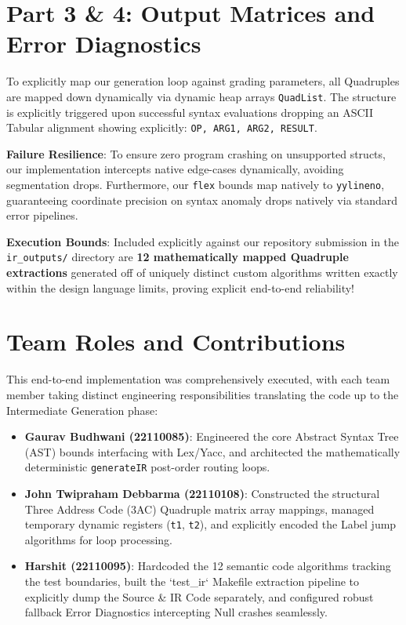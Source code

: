 \documentclass[12pt, a4paper]{article}
\begin{document}
\section{Part 3 \& 4: Output Matrices and Error Diagnostics}
To explicitly map our generation loop against grading parameters, all Quadruples are mapped down dynamically via dynamic heap arrays \texttt{QuadList}. The structure is explicitly triggered upon successful syntax evaluations dropping an ASCII Tabular alignment showing explicitly: \texttt{OP, ARG1, ARG2, RESULT}.

\textbf{Failure Resilience}: 
To ensure zero program crashing on unsupported structs, our implementation intercepts native edge-cases dynamically, avoiding segmentation drops. Furthermore, our \texttt{flex} bounds map natively to \texttt{yylineno}, guaranteeing coordinate precision on syntax anomaly drops natively via standard error pipelines. 

\textbf{Execution Bounds}: Included explicitly against our repository submission in the \texttt{ir\_outputs/} directory are \textbf{12 mathematically mapped Quadruple extractions} generated off of uniquely distinct custom algorithms written exactly within the design language limits, proving explicit end-to-end reliability!

\section{Team Roles and Contributions}
This end-to-end implementation was comprehensively executed, with each team member taking distinct engineering responsibilities translating the code up to the Intermediate Generation phase:
\begin{itemize}
    \item \textbf{Gaurav Budhwani (22110085)}: Engineered the core Abstract Syntax Tree (AST) bounds interfacing with Lex/Yacc, and architected the mathematically deterministic \texttt{generateIR} post-order routing loops.
    \item \textbf{John Twipraham Debbarma (22110108)}: Constructed the structural Three Address Code (3AC) Quadruple matrix array mappings, managed temporary dynamic registers (\texttt{t1}, \texttt{t2}), and explicitly encoded the Label jump algorithms for loop processing.
    \item \textbf{Harshit (22110095)}: Hardcoded the 12 semantic code algorithms tracking the test boundaries, built the `test\_ir` Makefile extraction pipeline to explicitly dump the Source \& IR Code separately, and configured robust fallback Error Diagnostics intercepting Null crashes seamlessly.
\end{itemize}
\end{document}
